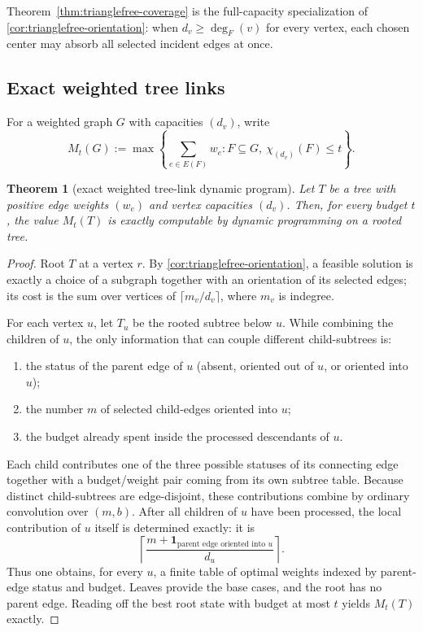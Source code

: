 \documentclass[11pt]{article}
\newtheorem{theorem}{Theorem}[section]
\theoremstyle{definition}
\newcommand{\Chi}{\chi}
\begin{document}
Theorem~\ref{thm:trianglefree-coverage} is the full-capacity specialization of \cref{cor:trianglefree-orientation}: when \(d_v\ge \deg_F(v)\) for every vertex, each chosen center may absorb all selected incident edges at once.

\subsection{Exact weighted tree links}
For a weighted graph \(G\) with capacities \((d_v)\), write
\[
M_t(G):=\max\left\{\sum_{e\in E(F)} w_e : F\subseteq G,\ \Chi_{(d_v)}(F)\le t\right\}.
\]

\begin{theorem}[exact weighted tree-link dynamic program]\label{thm:tree-dp}
Let \(T\) be a tree with positive edge weights \((w_e)\) and vertex capacities \((d_v)\). Then, for every budget \(t\), the value \(M_t(T)\) is exactly computable by dynamic programming on a rooted tree.
\end{theorem}

\begin{proof}
Root \(T\) at a vertex \(r\). By \cref{cor:trianglefree-orientation}, a feasible solution is exactly a choice of a subgraph together with an orientation of its selected edges; its cost is the sum over vertices of \(\lceil m_v/d_v\rceil\), where \(m_v\) is indegree.

For each vertex \(u\), let \(T_u\) be the rooted subtree below \(u\). While combining the children of \(u\), the only information that can couple different child-subtrees is:
\begin{enumerate}[label=(\roman*)]
    \item the status of the parent edge of \(u\) (absent, oriented out of \(u\), or oriented into \(u\));
    \item the number \(m\) of selected child-edges oriented into \(u\);
    \item the budget already spent inside the processed descendants of \(u\).
\end{enumerate}
Each child contributes one of the three possible statuses of its connecting edge together with a budget/weight pair coming from its own subtree table. Because distinct child-subtrees are edge-disjoint, these contributions combine by ordinary convolution over \((m,b)\). After all children of \(u\) have been processed, the local contribution of \(u\) itself is determined exactly: it is
\[
\left\lceil \frac{m+\mathbf 1_{\text{parent edge oriented into }u}}{d_u}\right\rceil.
\]
Thus one obtains, for every \(u\), a finite table of optimal weights indexed by parent-edge status and budget. Leaves provide the base cases, and the root has no parent edge. Reading off the best root state with budget at most \(t\) yields \(M_t(T)\) exactly.
\end{proof}
\end{document}
